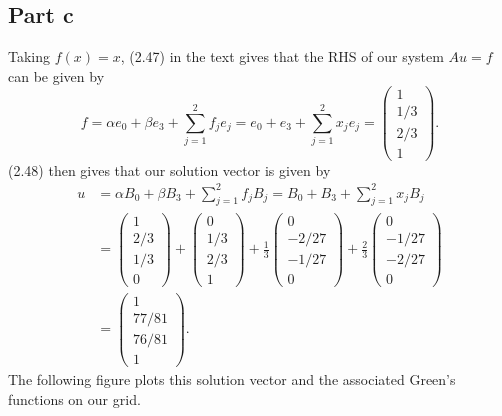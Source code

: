 \documentclass{article}
\begin{document}
\subsection{Part c}
Taking $f(x)=x$, (2.47) in the text gives that the RHS of our system $Au=f$ can be given by
\[
f=\alpha e_0+\beta e_3+\sum_{j=1}^2 f_je_j=e_0+e_3+\sum_{j=1}^2 x_je_j=\begin{pmatrix}
1\\1/3\\2/3\\1
\end{pmatrix}.
\]
(2.48) then gives that our solution vector is given by 
\begin{align*}
u&=\alpha B_0+\beta B_3+\sum_{j=1}^2 f_jB_j=B_0+B_3+\sum_{j=1}^2 x_jB_j\\&=
\begin{pmatrix}
1\\2/3\\1/3\\0
\end{pmatrix}+\begin{pmatrix}
0\\1/3\\2/3\\1
\end{pmatrix}+\frac{1}{3}\begin{pmatrix}
0\\-2/27\\-1/27\\0
\end{pmatrix}+\frac{2}{3}\begin{pmatrix}
0\\-1/27\\-2/27\\0
\end{pmatrix}\\&=
\begin{pmatrix}
1\\77/81\\76/81\\1 
\end{pmatrix}.
\end{align*}
The following figure plots this solution vector and the associated Green's functions on our grid.\\
\end{document}
